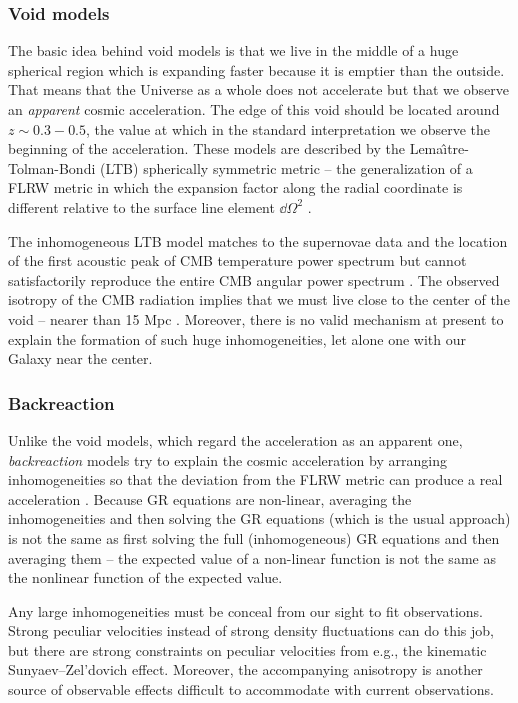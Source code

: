 \subsubsection{Void models}
The basic idea behind void models is that we live in the middle of a huge spherical region which is expanding faster because it is emptier than the outside. That means that the Universe as a whole does not accelerate but that we observe an \textit{apparent} cosmic acceleration. The edge of this void should be located around $z\sim0.3-0.5$, the value at which in the standard interpretation we observe the beginning of the acceleration. These models are described by the Lema\^\i tre-Tolman-Bondi (LTB) spherically symmetric metric -- the generalization of a FLRW metric in which the expansion factor along the radial coordinate is different relative to the surface line element $\dd\Omega^2$ \parencite{2013JCAP...02..047D,2006PhRvD..73h3519A}.

The inhomogeneous LTB model matches to the supernovae data and the location of the first acoustic peak of CMB temperature power spectrum but cannot satisfactorily reproduce the entire CMB angular power spectrum \parencite{2011JCAP...02..013C}. The observed isotropy of the CMB radiation implies that we must live close to the center of the void -- nearer than 15 Mpc \parencite{2006PhRvD..74j3520A}. Moreover, there is no valid mechanism at present to explain the formation of such huge inhomogeneities, let alone one with our Galaxy near the center.
\subsubsection{Backreaction}
Unlike the void models, which regard the acceleration as an apparent one, \textit{backreaction} models try to explain the cosmic acceleration by arranging inhomogeneities so that the deviation from the FLRW metric can produce a real acceleration \parencite{2011CQGra..28w5002S,2004JCAP...02..003R,2005PhRvD..72b3507M}. Because GR equations are non-linear, averaging the inhomogeneities and then solving the GR equations (which is the usual approach) is not the same as first solving the full (inhomogeneous) GR equations and then averaging them -- the expected value of a non-linear function is not the same as the nonlinear function of the expected value.

Any large inhomogeneities must be conceal from our sight to fit observations. Strong peculiar velocities instead of strong density fluctuations can do this job, but there are strong constraints on peculiar velocities from e.g., the kinematic Sunyaev--Zel'dovich effect. Moreover, the accompanying anisotropy is another source of observable effects difficult to accommodate with current observations.